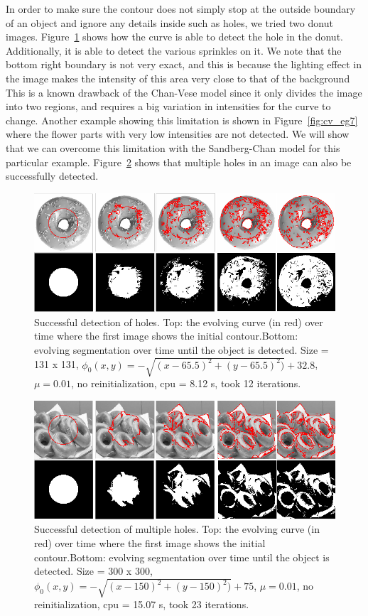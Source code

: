 \documentclass[10pt,twocolumn,letterpaper]{article}
\begin{document}
In order to make sure the contour does not simply stop at the outside boundary of an object and ignore any details inside such as holes, we tried two donut
images. Figure~\ref{fig:cv_eg5} shows how the curve is able to detect the hole in the donut. Additionally, it is able to detect the various sprinkles on it.
We note that the bottom right boundary is not very exact, and this is because the lighting effect in the image makes the intensity of this area very close to
that of the background This is a known drawback of the Chan-Vese model since it only divides the image into two regions, and requires a big variation in
intensities for the curve to change. Another example showing this limitation is shown in Figure~\ref{fig:cv_eg7} where the flower parts with very low
intensities are not detected. We will show that we can overcome this limitation with the Sandberg-Chan model for this particular example.
Figure~\ref{fig:cv_eg6} shows that multiple holes in an image can also be successfully detected.

\begin{figure}[t]
\centering
\includegraphics[width=12cm]{cv_eg5.png}
\caption{Successful detection of holes.  Top: the evolving curve (in red) over time where the first image shows the initial
contour.Bottom: evolving segmentation over time until the object is detected. Size = 131 x 131, $\phi_{0}(x,y) = - \sqrt{(x - 65.5)^2 + (y - 65.5)^2)} + 32.8$,
$\mu =0.01$, no reinitialization, cpu = 8.12 s, took 12 iterations.}
\label{fig:cv_eg5}
\end{figure}

\begin{figure}[t]
\centering
\includegraphics[width=12cm]{cv_eg6.png}
\caption{Successful detection of multiple holes.  Top: the evolving curve (in red) over time where the first image shows the initial
contour.Bottom: evolving segmentation over time until the object is detected. Size = 300 x 300, $\phi_{0}(x,y) = - \sqrt{(x - 150)^2 + (y - 150)^2)} + 75$,
$\mu =0.01$, no reinitialization, cpu = 15.07 s, took 23 iterations.}
\label{fig:cv_eg6}
\end{figure}
\end{document}
